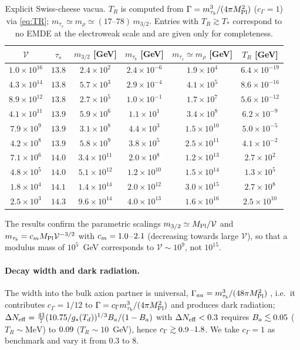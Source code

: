 \documentclass[11pt]{article}
\newcommand{\MP}{M_{\rm Pl}}
\begin{document}
\begin{table}[t]
\centering\small
\begin{tabular}{c|ccccc}
\toprule
$\mathcal V$ & $\tau_s$ & $m_{3/2}$ [GeV] & $m_{\tau_b}$ [GeV] & $m_{\tau_s}\simeq m_\rho$ [GeV] & $T_R$ [GeV]\\
\midrule
$1.0\times10^{16}$ & $13.8$ & $2.4\times10^{2}$ & $2.4\times10^{-6}$ & $1.9\times10^{4}$ & $6.4\times10^{-19}$ \\
$4.3\times10^{14}$ & $13.8$ & $5.7\times10^{3}$ & $2.9\times10^{-4}$ & $4.1\times10^{5}$ & $8.6\times10^{-16}$ \\
$8.9\times10^{12}$ & $13.8$ & $2.7\times10^{5}$ & $1.0\times10^{-1}$ & $1.7\times10^{7}$ & $5.6\times10^{-12}$ \\
$4.1\times10^{11}$ & $13.9$ & $5.9\times10^{6}$ & $1.1\times10^{1}$ & $3.4\times10^{8}$ & $6.2\times10^{-9}$ \\
$7.9\times10^{9}$ & $13.9$ & $3.1\times10^{8}$ & $4.4\times10^{3}$ & $1.5\times10^{10}$ & $5.0\times10^{-5}$ \\
$4.2\times10^{8}$ & $13.9$ & $5.8\times10^{9}$ & $3.8\times10^{5}$ & $2.5\times10^{11}$ & $4.1\times10^{-2}$ \\
$7.1\times10^{6}$ & $14.0$ & $3.4\times10^{11}$ & $2.0\times10^{8}$ & $1.2\times10^{13}$ & $2.7\times10^{2}$ \\
$4.8\times10^{5}$ & $14.0$ & $5.1\times10^{12}$ & $1.2\times10^{10}$ & $1.5\times10^{14}$ & $1.3\times10^{5}$ \\
$1.8\times10^{4}$ & $14.1$ & $1.4\times10^{14}$ & $2.0\times10^{12}$ & $3.0\times10^{15}$ & $2.7\times10^{8}$ \\
$2.5\times10^{3}$ & $14.3$ & $9.6\times10^{14}$ & $4.0\times10^{13}$ & $1.6\times10^{16}$ & $2.5\times10^{10}$ \\
\bottomrule
\end{tabular}
\caption{Explicit Swiss-cheese vacua. $T_R$ is computed from $\Gamma=m_{\tau_b}^3/(4\pi\MP^2)$ ($c_\Gamma=1$) via \eqref{eq:TR}; $m_{\tau_s}\simeq m_\rho\simeq(17\text{--}78)\,m_{3/2}$. Entries with $T_R\gtrsim T_*$ correspond to no EMDE at the electroweak scale and are given only for completeness.}\label{tab:explicit}
\end{table}
The results confirm the parametric scalings $m_{3/2}\simeq\MP/\mathcal V$ and $m_{\tau_b}=c_m\MP\mathcal V^{-3/2}$ with $c_m=1.0$--$2.1$ (decreasing towards large $\mathcal V$), so that a modulus mass of $10^5$~GeV corresponds to $\mathcal V\sim10^9$, not $10^{15}$.

\paragraph{Decay width and dark radiation.} The width into the bulk axion partner is universal, $\Gamma_{aa}=m_{\tau_b}^3/(48\pi\MP^2)$ \cite{Cicoli:2012}, i.e.\ it contributes $c_\Gamma=1/12$ to $\Gamma=c_\Gamma m_{\tau_b}^3/(4\pi\MP^2)$ and produces dark radiation; $\Delta N_{\rm eff}=\tfrac{43}{7}(10.75/g_*(T_d))^{1/3}B_a/(1-B_a)$ \cite{Higaki:2012} with $\Delta N_{\rm eff}<0.3$ requires $B_a\lesssim0.05$ ($T_R\sim\mathrm{MeV}$) to $0.09$ ($T_R\sim10$~GeV), hence $c_\Gamma\gtrsim0.9$--$1.8$. We take $c_\Gamma=1$ as benchmark and vary it from $0.3$ to $8$.
\end{document}
